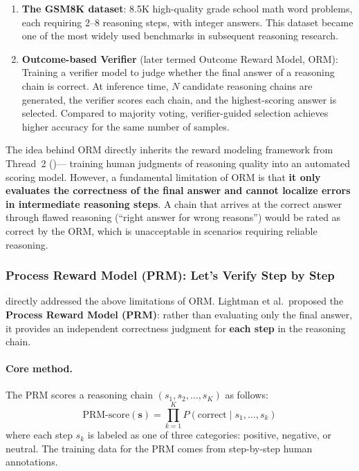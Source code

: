 \begin{enumerate}[leftmargin=2em]
  \item \textbf{The GSM8K dataset}: 8.5K high-quality grade school math word problems,
    each requiring 2--8 reasoning steps, with integer answers.
    This dataset became one of the most widely used benchmarks in subsequent reasoning research.

  \item \textbf{Outcome-based Verifier} (later termed Outcome Reward Model, ORM):
    Training a verifier model to judge whether the final answer of a reasoning chain is correct.
    At inference time, $N$ candidate reasoning chains are generated,
    the verifier scores each chain, and the highest-scoring answer is selected.
    Compared to majority voting, verifier-guided selection achieves higher accuracy for the same number of samples.
\end{enumerate}

\noindent
The idea behind ORM directly inherits the reward modeling framework from Thread~2
()---
training human judgments of reasoning quality into an automated scoring model.
However, a fundamental limitation of ORM is that
\textbf{it only evaluates the correctness of the final answer and cannot localize errors in intermediate reasoning steps}.
A chain that arrives at the correct answer through flawed reasoning (``right answer for wrong reasons'')
would be rated as correct by the ORM, which is unacceptable in scenarios requiring reliable reasoning.

\subsubsection{Process Reward Model (PRM): Let's Verify Step by Step}
\label{sec:t4-prm}

 directly addressed the above limitations of ORM.
Lightman et al.\ proposed the \textbf{Process Reward Model (PRM)}:
rather than evaluating only the final answer, it provides an independent correctness judgment for \textbf{each step} in the reasoning chain.

\paragraph{Core method.}
The PRM scores a reasoning chain $(s_1, s_2, \ldots, s_K)$ as follows:
\begin{equation}
\label{eq:prm-score}
\text{PRM-score}(\mathbf{s}) = \prod_{k=1}^{K} P(\text{correct} \mid s_1, \ldots, s_k)
\end{equation}
where each step $s_k$ is labeled as one of three categories: positive, negative, or neutral.
The training data for the PRM comes from step-by-step human annotations.

